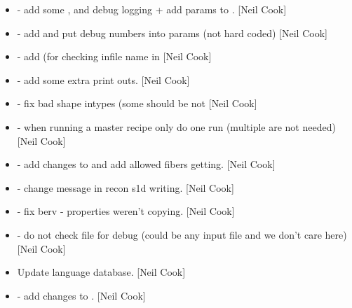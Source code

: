 \documentclass[a4paper,10pt,english]{report}
\begin{document}
\begin{itemize}
\item {} 
 - add some , and debug logging +
add params to . {[}Neil Cook{]}

\item {} 
 - add  and put debug numbers into
params (not hard coded) {[}Neil Cook{]}

\item {} 
 - add  (for checking infile
name in  {[}Neil Cook{]}

\item {} 
 - add some extra print outs. {[}Neil Cook{]}

\item {} 
 - fix bad shape intypes
(some should be  not  {[}Neil Cook{]}

\item {} 
 - when running a master recipe only do one run
(multiple are not needed) {[}Neil Cook{]}

\item {} 
 - add changes to  and
add allowed fibers getting. {[}Neil Cook{]}

\item {} 
 - change message in recon s1d writing.
{[}Neil Cook{]}

\item {} 
 - fix berv - properties weren’t copying. {[}Neil
Cook{]}

\item {} 
 - do not check file for debug (could be
any input file and we don’t care here) {[}Neil Cook{]}

\item {} 
Update language database. {[}Neil Cook{]}

\item {} 
 - add changes to .
{[}Neil Cook{]}


\end{itemize}
\end{document}
